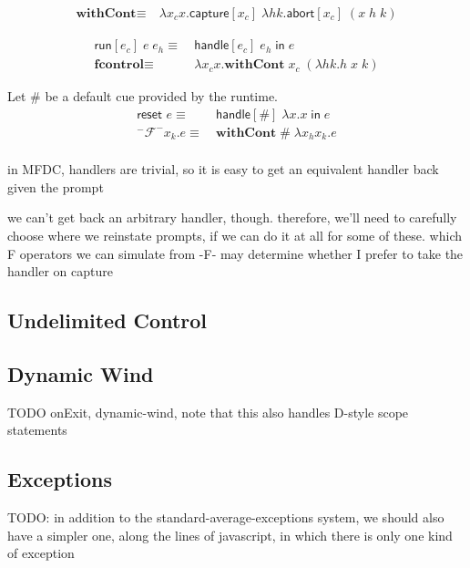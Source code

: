 \documentclass[11pt]{article}
\newcommand{\handle}[3]{\textsf{handle}[#1]\;#2\;\textsf{in}\;#3}
\newcommand{\abort}[2]{\textsf{abort}[#1]\;#2}
\newcommand{\capture}[2]{\textsf{capture}[#1]\;#2}
\newcommand{\letin}[2]{\textsf{let }#1\textsf{ in }#2}
\newcommand{\withCont}[2]{\textsf{withCont}[#1]\;#2}
\newcommand\F{\mathcal{F}}
\begin{document}
\begin{align*}
\textbf{withCont} \equiv\ &\lambda x_cx. \capture{x_c}{\lambda hk. \abort{x_c}{(x\;h\;k)}}
\end{align*}

\begin{align*}
\textsf{run}[e_c]\;e\;e_h \equiv\ &\handle{e_c}{e_h}{e} \\
\textbf{fcontrol} \equiv\ &\lambda x_cx. \textbf{withCont}\;x_c\;(\lambda hk.h\;x\;k)
%
\end{align*}

Let $\#$ be a default cue provided by the runtime.
\begin{align*}
\textsf{reset }e \equiv\ &\handle{\#}{\lambda x. x}{e} \\
^-\F^- x_k.e \equiv\ &\textbf{withCont}\;\#\;\lambda x_hx_k.e \\
\end{align*}



in MFDC, handlers are trivial, so it is easy to get an equivalent handler back given the prompt

we can't get back an arbitrary handler, though. therefore, we'll need to carefully choose where we reinstate prompts, if we can do it at all for some of these. which F operators we can simulate from -F- may determine whether I prefer to take the handler on capture

\subsection{Undelimited Control}

\subsection{Dynamic Wind}

TODO onExit, dynamic-wind, note that this also handles D-style scope statements

\subsection{Exceptions}
TODO: in addition to the standard-average-exceptions system, we should also have a simpler one, along the lines of javascript, in which there is only one kind of exception
\end{document}
